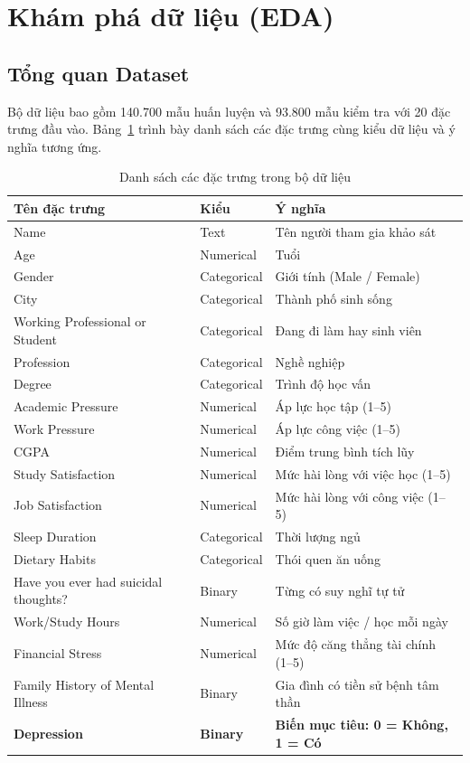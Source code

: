 \section{Khám phá dữ liệu (EDA)}
\label{sec:eda}

\subsection{Tổng quan Dataset}
\label{subsec:dataset_overview}

Bộ dữ liệu bao gồm 140.700 mẫu huấn luyện và 93.800 mẫu kiểm tra với 20 đặc trưng đầu vào. Bảng~\ref{tab:features} trình bày danh sách các đặc trưng cùng kiểu dữ liệu và ý nghĩa tương ứng.

\begin{table}[H]
\centering
\caption{Danh sách các đặc trưng trong bộ dữ liệu}
\label{tab:features}
\small
\begin{tabular}{llp{7.5cm}}
\toprule
\textbf{Tên đặc trưng} & \textbf{Kiểu} & \textbf{Ý nghĩa} \\
\midrule
Name & Text & Tên người tham gia khảo sát \\
Age & Numerical & Tuổi \\
Gender & Categorical & Giới tính (Male / Female) \\
City & Categorical & Thành phố sinh sống \\
Working Professional or Student & Categorical & Đang đi làm hay sinh viên \\
Profession & Categorical & Nghề nghiệp \\
Degree & Categorical & Trình độ học vấn \\
Academic Pressure & Numerical & Áp lực học tập (1--5) \\
Work Pressure & Numerical & Áp lực công việc (1--5) \\
CGPA & Numerical & Điểm trung bình tích lũy \\
Study Satisfaction & Numerical & Mức hài lòng với việc học (1--5) \\
Job Satisfaction & Numerical & Mức hài lòng với công việc (1--5) \\
Sleep Duration & Categorical & Thời lượng ngủ \\
Dietary Habits & Categorical & Thói quen ăn uống \\
Have you ever had suicidal thoughts? & Binary & Từng có suy nghĩ tự tử \\
Work/Study Hours & Numerical & Số giờ làm việc / học mỗi ngày \\
Financial Stress & Numerical & Mức độ căng thẳng tài chính (1--5) \\
Family History of Mental Illness & Binary & Gia đình có tiền sử bệnh tâm thần \\
\midrule
\textbf{Depression} & \textbf{Binary} & \textbf{Biến mục tiêu: 0 = Không, 1 = Có} \\
\bottomrule
\end{tabular}
\end{table}

